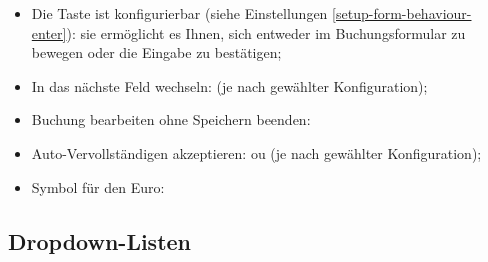 \begin{itemize}
	\item Die Taste  ist konfigurierbar (siehe Einstellungen \vref{setup-form-behaviour-enter}): sie ermöglicht es Ihnen, sich entweder im Buchungsformular zu bewegen oder die Eingabe zu bestätigen;
	\item In das nächste Feld wechseln: \keys{\tab} (je nach gewählter Konfiguration);
	\item Buchung bearbeiten ohne Speichern beenden: \keys{\esc}
	\item Auto-Vervollständigen akzeptieren: \keys{\tab} ou  (je nach gewählter Konfiguration);
	\item Symbol für den Euro: %
\end{itemize}

\subsection{Dropdown-Listen}

